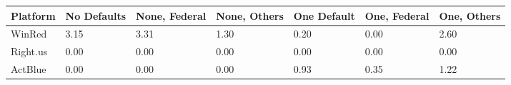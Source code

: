 \begin{tabularx}{.8\textwidth}{lXXXXXX}
  \toprule
Platform & No \newline Defaults & None, \newline Federal & None, \newline Others & One \newline Default & One, \newline Federal & One, \newline Others \\ 
  \midrule
WinRed & 3.15 & 3.31 & 1.30 & 0.20 & 0.00 & 2.60 \\ 
  Right.us & 0.00 & 0.00 & 0.00 & 0.00 & 0.00 & 0.00 \\ 
  ActBlue & 0.00 & 0.00 & 0.00 & 0.93 & 0.35 & 1.22 \\ 
   \bottomrule
\end{tabularx}
